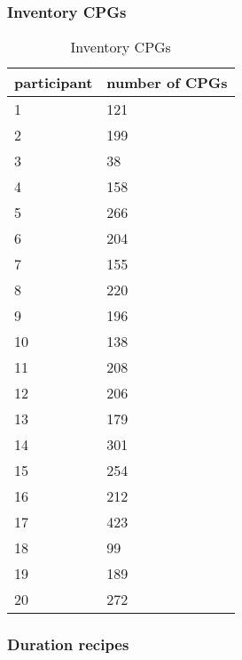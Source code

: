 \documentclass[]{article}
\begin{document}
\subsubsection{Inventory CPGs}\label{inventory-cpgs}

\begin{table}

\caption{\label{tab:unnamed-chunk-3}Inventory CPGs}
\centering
\begin{tabular}[t]{l|l}
\hline
participant & number of CPGs\\
\hline
\rowcolor{gray!6}  1 & 121\\
\hline
2 & 199\\
\hline
\rowcolor{gray!6}  3 & 38\\
\hline
4 & 158\\
\hline
\rowcolor{gray!6}  5 & 266\\
\hline
6 & 204\\
\hline
\rowcolor{gray!6}  7 & 155\\
\hline
8 & 220\\
\hline
\rowcolor{gray!6}  9 & 196\\
\hline
10 & 138\\
\hline
\rowcolor{gray!6}  11 & 208\\
\hline
12 & 206\\
\hline
\rowcolor{gray!6}  13 & 179\\
\hline
14 & 301\\
\hline
\rowcolor{gray!6}  15 & 254\\
\hline
16 & 212\\
\hline
\rowcolor{gray!6}  17 & 423\\
\hline
18 & 99\\
\hline
\rowcolor{gray!6}  19 & 189\\
\hline
20 & 272\\
\hline
\end{tabular}
\end{table}

\subsubsection{Duration recipes}\label{duration-recipes}
\end{document}

